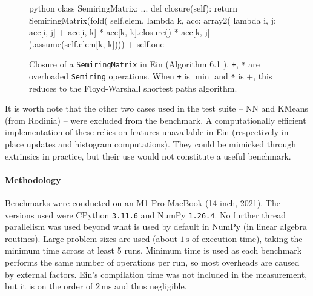 \begin{figure}
    \centering
\begin{cminted}{python}
class SemiringMatrix:
    ...
    def closure(self):
        return SemiringMatrix(fold(
            self.elem,
            lambda k, acc: array2(
                lambda i, j: acc[i, j] + acc[i, k] * acc[k, k].closure() * acc[k, j]
        ).assume(self.elem[k, k]))) + self.one
\end{cminted}
    \caption{Closure of a \texttt{SemiringMatrix} in Ein (Algorithm 6.1 \cite{abdali1985transitive}). \texttt{+}, \texttt{*} are overloaded \texttt{Semiring} operations. When \texttt{+} is $\min$ and \texttt{*} is $+$, this reduces to the Floyd-Warshall shortest paths algorithm.}
    \label{fig:semirings}
\end{figure}

It is worth note that the other two cases used in the test suite -- NN and KMeans (from Rodinia) -- were excluded from the benchmark. A computationally efficient implementation of these relies on features unavailable in Ein (respectively in-place updates and histogram computations). They could be mimicked through extrinsics in practice, but their use would not constitute a useful benchmark.

\paragraph{Methodology} Benchmarks were conducted on an M1 Pro MacBook (14-inch, 2021). The versions used were CPython \texttt{3.11.6} and NumPy \texttt{1.26.4}. No further thread parallelism was used beyond what is used by default in NumPy (in linear algebra routines). Large problem sizes are used (about $1\,\mathrm{s}$ of execution time), taking the minimum time across at least 5 runs. Minimum time is used as each benchmark performs the same number of operations per run, so most overheads are caused by external factors. Ein's compilation time was not included in the measurement, but it is on the order of $2\,\mathrm{ms}$ and thus negligible.

